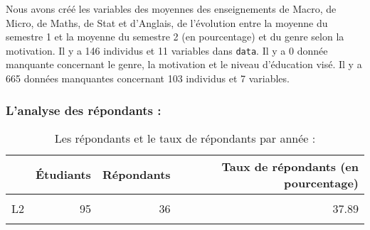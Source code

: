 \documentclass[
  11pt,
  french,
]{article}
\begin{document}
Nous avons créé les variables des moyennes des enseignements de Macro,
de Micro, de Maths, de Stat et d'Anglais, de l'évolution entre la
moyenne du semestre 1 et la moyenne du semestre 2 (en pourcentage) et du
genre selon la motivation. Il y a 146 individus et 11 variables dans
\texttt{data}. Il y a 0 donnée manquante concernant le genre, la
motivation et le niveau d'éducation visé. Il y a 665 données manquantes
concernant 103 individus et 7 variables.

\hypertarget{lanalyse-des-ruxe9pondants}{%
\subsubsection{L'analyse des répondants
:}\label{lanalyse-des-ruxe9pondants}}

\begin{table}[!h]

\caption{\label{tab:table3}Les répondants et le taux de répondants par année :}
\centering
\begin{tabular}[t]{lrrr}
\toprule
  & Étudiants & Répondants & Taux de répondants (en pourcentage)\\
\midrule
\cellcolor{gray!6}{L1} & \cellcolor{gray!6}{264} & \cellcolor{gray!6}{70} & \cellcolor{gray!6}{26.52}\\
L2 & 95 & 36 & 37.89\\
\cellcolor{gray!6}{L3} & \cellcolor{gray!6}{65} & \cellcolor{gray!6}{40} & \cellcolor{gray!6}{61.54}\\
\bottomrule
\end{tabular}
\end{table}

\begin{table}[!h]

\caption{\label{tab:table4}Le genre des répondants et du taux de répondants par année  :}
\centering
{}
\end{table}
\end{document}
